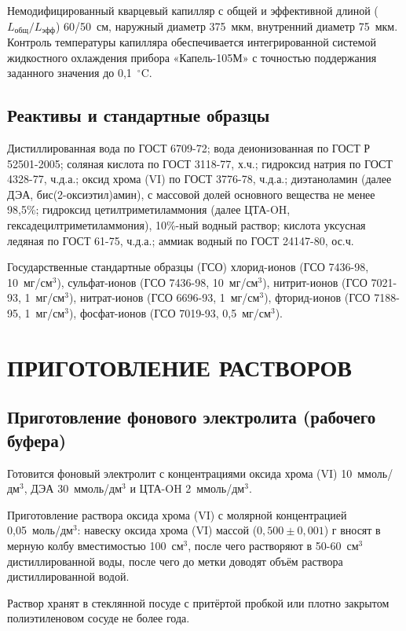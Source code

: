 Немодифицированный кварцевый капилляр с общей и эффективной длиной ($L_{\text{общ}}/L_{\text{эфф}}$) 60/50~см, наружный диаметр 375~мкм, внутренний диаметр 75~мкм. Контроль температуры капилляра обеспечивается интегрированной системой жидкостного охлаждения прибора «Капель-105М» с точностью поддержания заданного значения до 0,1~$^\circ$C.

\subsection{Реактивы и стандартные образцы}

Дистиллированная вода по ГОСТ 6709-72; вода деионизованная по ГОСТ Р 52501-2005; соляная кислота по ГОСТ 3118-77, х.ч.; гидроксид натрия по ГОСТ 4328-77, ч.д.а.; оксид хрома (VI) по ГОСТ 3776-78, ч.д.а.; диэтаноламин (далее ДЭА, бис(2-оксиэтил)амин), с массовой долей основного вещества не менее 98,5\%; гидроксид цетилтриметиламмония (далее ЦТА-OH, гексадецилтриметиламмония), 10\%-ный водный раствор; кислота уксусная ледяная по ГОСТ 61-75, ч.д.а.; аммиак водный по ГОСТ 24147-80, ос.ч.

Государственные стандартные образцы (ГСО) хлорид-ионов (ГСО 7436-98, 10~мг/см$^3$), сульфат-ионов (ГСО 7436-98, 10~мг/см$^3$), нитрит-ионов (ГСО 7021-93, 1~мг/см$^3$), нитрат-ионов (ГСО 6696-93, 1~мг/см$^3$), фторид-ионов (ГСО 7188-95, 1~мг/см$^3$), фосфат-ионов (ГСО 7019-93, 0,5~мг/см$^3$).

\section{ПРИГОТОВЛЕНИЕ РАСТВОРОВ}

\subsection{Приготовление фонового электролита (рабочего буфера)}

Готовится фоновый электролит с концентрациями оксида хрома (VI) 10~ммоль/дм$^3$, ДЭА 30~ммоль/дм$^3$ и ЦТА-OH 2~ммоль/дм$^3$.

Приготовление раствора оксида хрома (VI) с молярной концентрацией 0,05~моль/дм$^3$: навеску оксида хрома (VI) массой ($0,500 \pm 0,001$) г вносят в мерную колбу вместимостью 100~см$^3$, после чего растворяют в 50-60~см$^3$ дистиллированной воды, после чего до метки доводят объём раствора дистиллированной водой.

Раствор хранят в стеклянной посуде с притёртой пробкой или плотно закрытом полиэтиленовом сосуде не более года.

